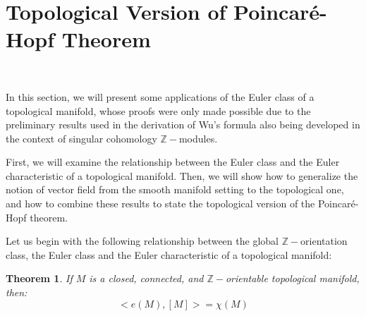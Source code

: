 \documentclass[12pt,oneside]{book}
\newtheorem{teo}    {Theorem}[chapter]
\newcommand{\Z}{\mathbb{Z}}
\begin{document}
    \section{Topological Version of Poincaré-Hopf Theorem}\label{sec_poincare}

    \

    In this section, we will present some applications of the Euler class of a topological 
    manifold, whose proofs were only made possible due to the preliminary results used in the derivation of Wu's 
    formula also being developed in the context of singular cohomology $\Z-$modules.

    First, we will examine the relationship between the Euler class and the Euler characteristic of a topological manifold. Then, we will show 
    how to generalize the notion of vector field from the smooth manifold setting to the 
    topological one, and how to combine these results to state the topological version of the Poincaré-Hopf 
    theorem.

    Let us begin with the following relationship between the global $\Z-$orientation class, the Euler 
    class and the Euler characteristic of a topological manifold:

    \begin{teo}\label{ap_euler_1}
    	If $M$ is a closed, connected, and $\Z-$orientable topological manifold, then:
    	$$ <e(M),[M]> = \chi(M) $$
    \end{teo}
\end{document}
